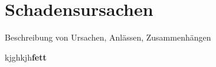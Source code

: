 \chapter{Schadensursachen}


Beschreibung von Ursachen, Anlässen, Zusammenhängen

kjghkjh\textbf{fett}